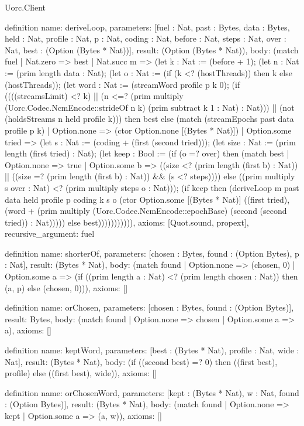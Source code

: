\begin{lexlean}{Uorc.Client}
\begin{semanticmodule}
definition{
  name: deriveLoop,
  parameters: [fuel : Nat, past : Bytes, data : Bytes, held : Nat, profile : Nat, p : Nat, coding : Nat, before : Nat, steps : Nat, over : Nat, best : (Option (Bytes * Nat))],
  result: (Option (Bytes * Nat)),
  body: (match fuel
    | Nat.zero => best
    | Nat.succ m => (let k : Nat := (before + 1); (let n : Nat := (prim length data : Nat); (let o : Nat := (if (k <? (hostThreads)) then k else (hostThreads)); (let word : Nat := (streamWord profile p k 0); (if ((((streamsLimit) <? k) || (n <=? (prim multiply (Uorc.Codec.NcmEncode::strideOf n k) (prim subtract k 1 : Nat) : Nat))) || (not (holdsStreams n held profile k))) then best else (match (streamEpochs past data profile p k)
      | Option.none => (ctor Option.none [(Bytes * Nat)])
      | Option.some tried => (let s : Nat := (coding + (first (second tried))); (let size : Nat := (prim length (first tried) : Nat); (let keep : Bool := (if (o =? over) then (match best
        | Option.none => true
        | Option.some b => ((size <? (prim length (first b) : Nat)) || ((size =? (prim length (first b) : Nat)) && (s <? steps)))) else ((prim multiply s over : Nat) <? (prim multiply steps o : Nat))); (if keep then (deriveLoop m past data held profile p coding k s o (ctor Option.some [(Bytes * Nat)] ((first tried), (word + (prim multiply (Uorc.Codec.NcmEncode::epochBase) (second (second tried)) : Nat))))) else best))))))))))),
  axioms: [Quot.sound, propext],
  recursive_argument: fuel
}

definition{
  name: shorterOf,
  parameters: [chosen : Bytes, found : (Option Bytes), p : Nat],
  result: (Bytes * Nat),
  body: (match found
    | Option.none => (chosen, 0)
    | Option.some a => (if ((prim length a : Nat) <? (prim length chosen : Nat)) then (a, p) else (chosen, 0))),
  axioms: []
}

definition{
  name: orChosen,
  parameters: [chosen : Bytes, found : (Option Bytes)],
  result: Bytes,
  body: (match found
    | Option.none => chosen
    | Option.some a => a),
  axioms: []
}

definition{
  name: keptWord,
  parameters: [best : (Bytes * Nat), profile : Nat, wide : Nat],
  result: (Bytes * Nat),
  body: (if ((second best) =? 0) then ((first best), profile) else ((first best), wide)),
  axioms: []
}

definition{
  name: orChosenWord,
  parameters: [kept : (Bytes * Nat), w : Nat, found : (Option Bytes)],
  result: (Bytes * Nat),
  body: (match found
    | Option.none => kept
    | Option.some a => (a, w)),
  axioms: []
}


\end{semanticmodule}
\end{lexlean}
